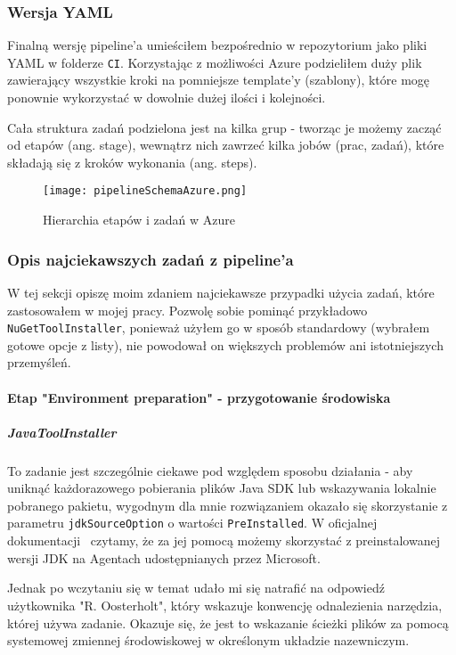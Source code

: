 \subsubsection{Wersja YAML}
Finalną wersję pipeline'a umieściłem bezpośrednio w repozytorium jako pliki YAML w folderze \verb|CI|.
Korzystając z możliwości Azure podzieliłem duży plik zawierający wszystkie kroki 
na pomniejsze template'y (szablony), które mogę ponownie wykorzystać w dowolnie dużej 
ilości i kolejności.

Cała struktura zadań podzielona jest na kilka grup - tworząc je możemy zacząć od etapów (ang. stage), 
wewnątrz nich zawrzeć kilka jobów (prac, zadań), które składają się z kroków wykonania (ang. steps).


\begin{figure}[ht]
    \texttt{[image: pipelineSchemaAzure.png]}
    \caption{Hierarchia etapów i zadań w Azure~\cite{pipelineSchemaAzure_source}}
    \label{img:pipelineSchemaAzure}
    
\end{figure}

\subsubsection{Opis najciekawszych zadań z pipeline'a}

W tej sekcji opiszę moim zdaniem najciekawsze przypadki użycia zadań, które zastosowałem 
w mojej pracy. Pozwolę sobie pominąć przykładowo \verb|NuGetToolInstaller|, ponieważ użyłem 
go w sposób standardowy (wybrałem gotowe opcje z listy), nie powodował on większych problemów
ani istotniejszych przemyśleń.

\paragraph{Etap "Environment preparation" - przygotowanie środowiska}

\subparagraph{JavaToolInstaller} \label{javaTask}
To zadanie jest szczególnie ciekawe pod względem sposobu działania - aby uniknąć każdorazowego 
pobierania plików Java SDK lub wskazywania lokalnie pobranego pakietu, wygodnym dla mnie 
rozwiązaniem okazało się skorzystanie z parametru \verb|jdkSourceOption| o wartości \verb|PreInstalled|.
W oficjalnej dokumentacji~\cite{jdkSourceOption} czytamy, że za jej pomocą możemy skorzystać 
z preinstalowanej wersji JDK na Agentach udostępnianych przez Microsoft.

Jednak po wczytaniu się w temat udało mi się natrafić na odpowiedź~\cite{javaToolInstaller_StackOverflow} 
użytkownika "R. Oosterholt", który wskazuje konwencję odnalezienia narzędzia, której używa zadanie.
Okazuje się, że jest to wskazanie ścieżki plików za pomocą systemowej zmiennej środowiskowej w określonym 
układzie nazewniczym.

